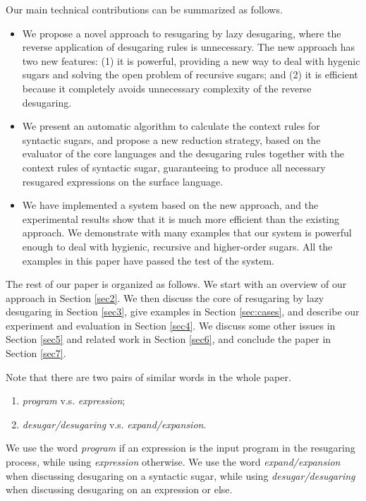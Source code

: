 Our main technical contributions can be summarized as follows.
\begin{itemize}
\item We propose a novel approach to resugaring by lazy desugaring, where the reverse application of desugaring rules is unnecessary. The new approach has two new features: (1) it is powerful, providing a new way to deal with hygenic sugars and solving the open problem of recursive sugars; and (2) it is efficient because it completely avoids unnecessary complexity of the reverse desugaring.

\item We present an automatic algorithm to calculate the context rules for syntactic sugars, and propose a new reduction strategy, based on the evaluator of the core languages and the desugaring rules together with the context rules of syntactic sugar, guaranteeing to produce all necessary resugared expressions on the surface language.

\item We have implemented a system based on the new approach, and the experimental results show that it is much more efficient than the existing approach. We demonstrate with many examples that our system is powerful enough to deal with hygienic, recursive and higher-order sugars. All the examples in this paper have passed the test of the system.


\end{itemize}

The rest of our paper is organized as follows. We start with an overview of our approach in Section \ref{sec2}. We then discuss the core of resugaring by lazy desugaring in Section \ref{sec3}, give examples in Section \ref{sec:cases}, and describe our experiment and evaluation in Section \ref{sec4}. We discuss some other issues in Section \ref{sec5} and related work in Section \ref{sec6}, and conclude the paper in Section \ref{sec7}.

Note that there are two pairs of similar words in the whole paper.
\begin{enumerate}
	\item \emph{program} v.s. \emph{expression};
	\item \emph{desugar/desugaring} v.s. \emph{expand/expansion}.
\end{enumerate}
We use the word \emph{program} if an expression is the input program in the  resugaring process, while using \emph{expression} otherwise. We use the word \emph{expand/expansion} when discussing desugaring on a syntactic sugar, while using \emph{desugar/desugaring} when discussing desugaring on an expression or else.
